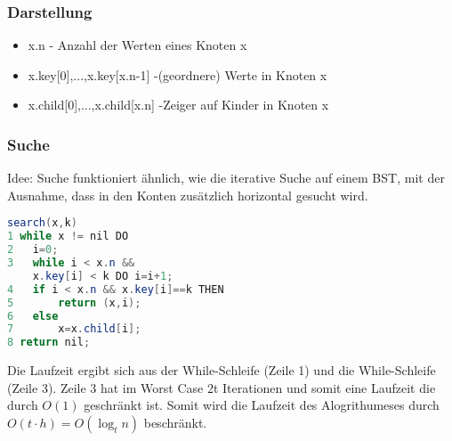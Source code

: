 \documentclass[jou,apacite]{apa6}
\begin{document}
\subsubsection{Darstellung}
\begin{itemize}
    \item x.n - Anzahl der Werten eines Knoten x
    \item x.key[0],...,x.key[x.n-1] -(geordnere) Werte in Knoten x
    \item x.child[0],...,x.child[x.n] -Zeiger auf Kinder in Knoten x
\end{itemize}
\subsubsection{Suche}
Idee: Suche funktioniert ähnlich, wie die iterative Suche auf einem BST, mit der Ausnahme, dass in den Konten zusätzlich horizontal gesucht wird.
\begin{lstlisting}[language=java]
search(x,k)
1 while x != nil DO
2   i=0;
3   while i < x.n &&
    x.key[i] < k DO i=i+1;
4   if i < x.n && x.key[i]==k THEN
5       return (x,i);
6   else
7       x=x.child[i];
8 return nil;
\end{lstlisting}
Die Laufzeit ergibt sich aus der While-Schleife (Zeile 1) und die While-Schleife (Zeile 3). Zeile 3 hat im Worst Case 2t Iterationen und somit eine Laufzeit die durch $O(1)$ geschränkt ist. Somit wird die Laufzeit des Alogrithumeses durch $O(t\cdot h) = O(\log_t n)$ beschränkt.
\end{document}
